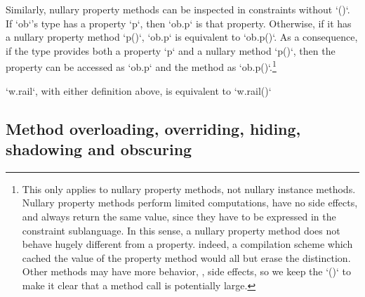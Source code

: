 Similarly, nullary property methods can be inspected in constraints without
\xcd`()`. If \xcd`ob`'s type has a property \xcd`p`, then \xcd`ob.p` is that
property. Otherwise, if it has a nullary property method \xcd`p()`, \xcd`ob.p`
is equivalent to \xcd`ob.p()`. As a consequence, if the type provides both a
property \xcd`p` and a nullary method \xcd`p()`, then the property can be
accessed as \xcd`ob.p` and the method as \xcd`ob.p()`.\footnote{This only
applies to nullary property methods, not nullary instance methods.  Nullary
property methods perform limited computations, have no side effects, and
always return the same value, since
they have to be expressed in the constraint sublanguage.  In this sense, a
nullary property method does not behave hugely different from a property.
indeed, a compilation scheme which cached the value of the property method
would all but erase the distinction.  Other methods may
have more behavior, \eg, side effects, so we keep the \xcd`()` to make it
clear that a method call is potentially large.
}

\xcd`w.rail`, with either definition above, 
is equivalent to 
\xcd`w.rail()`




\subsection{Method overloading, overriding, hiding, shadowing and obscuring}
\label{MethodOverload}



